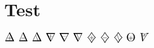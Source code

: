 \documentclass[]{article}
\newcommand{\rndinterval}{\diamondsuit}
\newcommand{\rndupin}[1]{%
	\ooalign{\Large $\Delta$\cr\hss\raisebox{0.4ex}{\scriptsize $#1$}\hss}}%
\newcommand{\rnddownin}[1]{%
	\ooalign{\Large $\nabla$\cr\hss\raisebox{0.9ex}{\scriptsize $#1$}\hss}}%
\newcommand{\rndintervalin}[1]{%
	\ooalign{\Large $\rndinterval$\cr\hss\raisebox{0.45 ex}{\scriptsize $#1$}\hss}}%
\newcommand{\compop}[1]{%
	\ooalign{\Large O\cr\hss\raisebox{0.45 ex}{\scriptsize $#1$}\hss}}%
\newcommand{\xV}{%
	\ooalign{\Large $V$\cr\hss\raisebox{1.4ex}{\scriptsize $x$}\hss}}%
\begin{document}
\section{Test}
$\rndupin{+}$ $\rndupin{-}$ $\rndupin{\setminus}$
$\rnddownin{+}$ $\rnddownin{-}$ $\rnddownin{\setminus}$
$\rndintervalin{+}$ $\rndintervalin{-}$ $\rndintervalin{\setminus}$
$\compop{+}$
$\xV$
\end{document}

